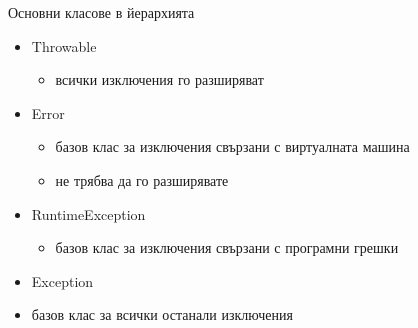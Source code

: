 \documentclass{beamer}
\begin{document}
\begin{frame}{Основни класове в йерархията}
  \transdissolve
  \begin{itemize}
  \item Throwable
    \begin{itemize}
    \item всички изключения го разширяват
    \end{itemize}
  \item Error
    \begin{itemize}
      \item базов клас за изключения свързани с виртуалната машина
      \item не трябва да го разширявате
    \end{itemize}
  \item RuntimeException
    \begin{itemize}
      \item базов клас за изключения свързани с програмни грешки
    \end{itemize}
  \item Exception
    \item базов клас за всички останали изключения
  \end{itemize}
\end{frame}
\end{document}
